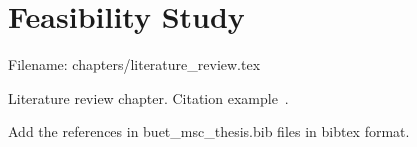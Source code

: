 \chapter{Feasibility Study} \label{ch:literature_review}
Filename: chapters/literature\_review.tex

Literature review chapter. Citation example~\cite{Rida_19}.

Add the references in buet\_msc\_thesis.bib files in bibtex format.

 


